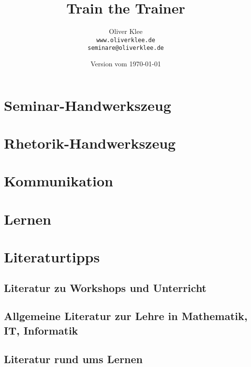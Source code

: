 \documentclass[a4paper,openany,twoside,titlepage,10pt,headsepline]{scrbook}
\title{Train the Trainer}
\author{Oliver Klee\\\texttt{www.oliverklee.de}\\\texttt{seminare@oliverklee.de}}
\date{Version vom \today}
\begin{document}
\frontmatter

\maketitle

\tableofcontents

\mainmatter

\chapter{Seminar-Handwerkszeug}










\chapter{Rhetorik-Handwerkszeug}




\chapter{Kommunikation}






\chapter{Lernen}












\backmatter

\chapter{Literaturtipps}

\section{Literatur zu Workshops und Unterricht}
\cite{moderationstechniken, visualisieren-praesentieren-moderieren, workshop-buch, treibhaeuser-der-zukunft}

\section{Allgemeine Literatur zur Lehre in Mathematik, IT, Informatik}
\cite{teaching-engineering, red-pen, it-trainer}

\section{Literatur rund ums Lernen}
\cite{denken-lernen-vergessen, lernen-zu-lernen}




\end{document}
